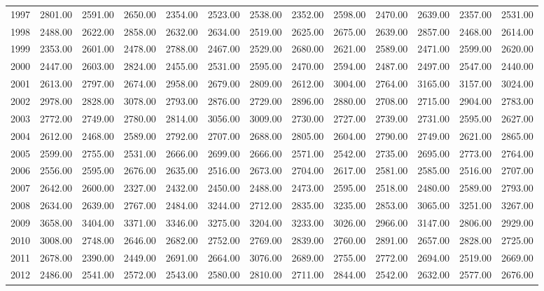 \begin{longtable}{rrrrrrrrrrrrr}
  1997 & 2801.00 & 2591.00 & 2650.00 & 2354.00 & 2523.00 & 2538.00 & 2352.00 & 2598.00 & 2470.00 & 2639.00 & 2357.00 & 2531.00 \\ 
  1998 & 2488.00 & 2622.00 & 2858.00 & 2632.00 & 2634.00 & 2519.00 & 2625.00 & 2675.00 & 2639.00 & 2857.00 & 2468.00 & 2614.00 \\ 
  1999 & 2353.00 & 2601.00 & 2478.00 & 2788.00 & 2467.00 & 2529.00 & 2680.00 & 2621.00 & 2589.00 & 2471.00 & 2599.00 & 2620.00 \\ 
  2000 & 2447.00 & 2603.00 & 2824.00 & 2455.00 & 2531.00 & 2595.00 & 2470.00 & 2594.00 & 2487.00 & 2497.00 & 2547.00 & 2440.00 \\ 
  2001 & 2613.00 & 2797.00 & 2674.00 & 2958.00 & 2679.00 & 2809.00 & 2612.00 & 3004.00 & 2764.00 & 3165.00 & 3157.00 & 3024.00 \\ 
  2002 & 2978.00 & 2828.00 & 3078.00 & 2793.00 & 2876.00 & 2729.00 & 2896.00 & 2880.00 & 2708.00 & 2715.00 & 2904.00 & 2783.00 \\ 
  2003 & 2772.00 & 2749.00 & 2780.00 & 2814.00 & 3056.00 & 3009.00 & 2730.00 & 2727.00 & 2739.00 & 2731.00 & 2595.00 & 2627.00 \\ 
  2004 & 2612.00 & 2468.00 & 2589.00 & 2792.00 & 2707.00 & 2688.00 & 2805.00 & 2604.00 & 2790.00 & 2749.00 & 2621.00 & 2865.00 \\ 
  2005 & 2599.00 & 2755.00 & 2531.00 & 2666.00 & 2699.00 & 2666.00 & 2571.00 & 2542.00 & 2735.00 & 2695.00 & 2773.00 & 2764.00 \\ 
  2006 & 2556.00 & 2595.00 & 2676.00 & 2635.00 & 2516.00 & 2673.00 & 2704.00 & 2617.00 & 2581.00 & 2585.00 & 2516.00 & 2707.00 \\ 
  2007 & 2642.00 & 2600.00 & 2327.00 & 2432.00 & 2450.00 & 2488.00 & 2473.00 & 2595.00 & 2518.00 & 2480.00 & 2589.00 & 2793.00 \\ 
  2008 & 2634.00 & 2639.00 & 2767.00 & 2484.00 & 3244.00 & 2712.00 & 2835.00 & 3235.00 & 2853.00 & 3065.00 & 3251.00 & 3267.00 \\ 
  2009 & 3658.00 & 3404.00 & 3371.00 & 3346.00 & 3275.00 & 3204.00 & 3233.00 & 3026.00 & 2966.00 & 3147.00 & 2806.00 & 2929.00 \\ 
  2010 & 3008.00 & 2748.00 & 2646.00 & 2682.00 & 2752.00 & 2769.00 & 2839.00 & 2760.00 & 2891.00 & 2657.00 & 2828.00 & 2725.00 \\ 
  2011 & 2678.00 & 2390.00 & 2449.00 & 2691.00 & 2664.00 & 3076.00 & 2689.00 & 2755.00 & 2772.00 & 2694.00 & 2519.00 & 2669.00 \\ 
  2012 & 2486.00 & 2541.00 & 2572.00 & 2543.00 & 2580.00 & 2810.00 & 2711.00 & 2844.00 & 2542.00 & 2632.00 & 2577.00 & 2676.00 \\ 

\end{longtable}
